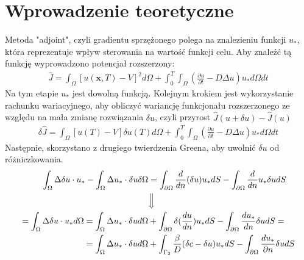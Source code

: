 \documentclass{article}
\begin{document}
\section{Wprowadzenie teoretyczne}
Metoda "adjoint", czyli gradientu sprzężonego polega na znalezieniu funkcji $u_*$, która reprezentuje wpływ sterowania na wartość funkcji celu. Aby znaleźć tą funkcję wyprowadzono potencjał rozszerzony:
\begin{align*}
	\hat{J} = \int_{\Omega}[u(\textbf{x},T)-V]^2d\Omega + \int_{0}^{T}\int_\Omega(	\frac{\partial u}{\partial t}-D\Delta u)u_* d\Omega dt
\end{align*}
Na tym etapie $u_*$ jest dowolną funkcją. Kolejnym krokiem jest wykorzystanie rachunku wariacyjnego, aby obliczyć wariancję funkcjonału rozszerzonego ze względu na mała zmianę rozwiązania $\delta u$, czyli przyrost $\hat{J}(u+\delta u) - \hat{J}(u)$
\begin{align*}
	\delta\hat{J} = \int_{\Omega}[u(T)-V]\delta u(T)d\Omega + \int_{0}^T\int_{\Omega}(	\frac{\partial u}{\partial t}-D\Delta u)u_*d\Omega dt
\end{align*}
Następnie, skorzystano z drugiego twierdzenia Greena, aby uwolnić  $\delta u$ od różniczkowania.
\begin{align*}
	\int_{\Omega}\Delta\delta u\cdot u_* - \int_{\Omega}\Delta u_*\cdot\delta u\delta\Omega &= \int_{\partial\Omega}\frac{d}{dn}(\delta u)u_* dS-\int_{\partial\Omega}\frac{d}{dn}u_*\delta u dS\\
	&\Big\Downarrow\\
	=\int_{\Omega}\Delta\delta u \cdot u_* d\Omega = \int_{\Omega}\Delta u_*\cdot \delta u d \Omega &+ \int_{\partial\Omega}\delta(\frac{du}{dn})u_* dS - \int_{\partial\Omega}\frac{du_*}{dn}\delta u dS=\\
	=\int_{\Omega}\Delta u_*\cdot \delta u d\Omega &+ \int_{\Gamma_2}\frac{\beta}{D}(\delta c - \delta u)u_*dS - \int_{\partial\Omega}\frac{du_*}{\partial n}\delta u dS
\end{align*}
\end{document}
